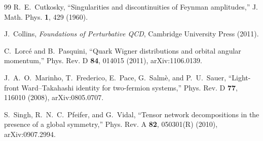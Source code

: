 \documentclass[11pt]{article}
\begin{document}
\begin{thebibliography}{99}
R.~E.~Cutkosky,
``Singularities and discontinuities of Feynman amplitudes,''
J. Math. Phys. \textbf{1}, 429 (1960).

J.~Collins,
\emph{Foundations of Perturbative QCD},
Cambridge University Press (2011).

C.~Lorc\'e and B.~Pasquini,
``Quark Wigner distributions and orbital angular momentum,''
Phys. Rev. D \textbf{84}, 014015 (2011),
arXiv:1106.0139.

J.~A.~O.~Marinho, T.~Frederico, E.~Pace, G.~Salm\`e, and P.~U.~Sauer,
``Light-front Ward--Takahashi identity for two-fermion systems,''
Phys. Rev. D \textbf{77}, 116010 (2008),
arXiv:0805.0707.

S.~Singh, R.~N.~C.~Pfeifer, and G.~Vidal,
``Tensor network decompositions in the presence of a global symmetry,''
Phys. Rev. A \textbf{82}, 050301(R) (2010),
arXiv:0907.2994.

\end{thebibliography}
\end{document}
